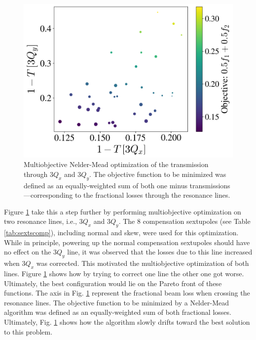 \begin{figure}[H]
    \centering
    \includegraphics[width=\columnwidth]{chapter4/mo_opti.png}
    \caption{Multiobjective Nelder-Mead optimization of the transmission through $3Q_x$ and $3Q_y$. The objective function to be minimized was defined as an equally-weighted sum of both one minus transmissions---corresponding to the fractional losses through the resonance lines.}
    \label{fig:MO_neldermead}
\end{figure}

Figure \ref{fig:MO_neldermead} take this a step further by performing multiobjective optimization on two resonance lines, i.e., $3Q_x$ and $3Q_y$. The 8 compensation sextupoles (see Table \ref{tab:sextscomp}), including normal and skew, were used for this optimization. While in principle, powering up the normal compensation sextupoles should have no effect on the $3Q_y$ line, it was observed that the losses due to this line increased when $3Q_x$ was corrected. This motivated the multiobjective optimization of both lines. Figure \ref{fig:MO_neldermead} shows how by trying to correct one line the other one got worse. Ultimately, the best configuration would lie on the Pareto front of these functions. The axis in Fig. \ref{fig:MO_neldermead} represent the fractional beam loss when crossing the resonance lines. The objective function to be minimized by a Nelder-Mead algorithm was defined as an equally-weighted sum of both fractional losses. Ultimately, Fig. \ref{fig:MO_neldermead} shows how the algorithm slowly drifts toward the best solution to this problem. 

